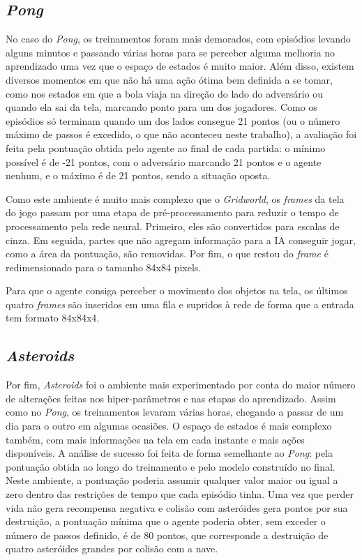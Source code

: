 \subsection{\textit{Pong}}
\label{sec:exp_pong}

No caso do \textit{Pong}, os treinamentos foram mais demorados, com episódios levando alguns minutos e passando várias horas para se perceber alguma melhoria no aprendizado uma vez que o espaço de estados é muito maior.
Além disso, existem diversos momentos em que não há uma ação ótima bem definida a se tomar, como nos estados em que a bola viaja na direção do lado do adversário ou quando ela sai da tela, marcando ponto para um dos jogadores.
Como os episódios só terminam quando um dos lados consegue 21 pontos (ou o número máximo de passos é excedido, o que não aconteceu neste trabalho), a avaliação foi feita pela pontuação obtida pelo agente ao final de cada partida:
o mínimo possível é de -21 pontos, com o adversário marcando 21 pontos e o agente nenhum, e o máximo é de 21 pontos, sendo a situação oposta.

Como este ambiente é muito mais complexo que o \textit{Gridworld}, os \textit{frames} da tela do jogo passam por uma etapa de pré-processamento para reduzir o tempo de processamento pela rede neural.
Primeiro, eles são convertidos para escalas de cinza.
Em seguida, partes que não agregam informação para a IA conseguir jogar, como a área da pontuação, são removidas.
Por fim, o que restou do \textit{frame} é redimensionado para o tamanho 84x84 pixels.

Para que o agente consiga perceber o movimento dos objetos na tela, os últimos quatro \textit{frames} são inseridos em uma fila e supridos à rede de forma que a entrada tem formato 84x84x4.

\subsection{\textit{Asteroids}}
\label{sec:exp_asteroids}

Por fim, \textit{Asteroids} foi o ambiente mais experimentado por conta do maior número de alterações feitas nos hiper-parâmetros e nas etapas do aprendizado.
Assim como no \textit{Pong}, os treinamentos levaram várias horas, chegando a passar de um dia para o outro em algumas ocasiões.
O espaço de estados é mais complexo também, com mais informações na tela em cada instante e mais ações disponíveis.
A análise de sucesso foi feita de forma semelhante ao \textit{Pong}: pela pontuação obtida ao longo do treinamento e pelo modelo construído no final.
Neste ambiente, a pontuação poderia assumir qualquer valor maior ou igual a zero dentro das restrições de tempo que cada episódio tinha.
Uma vez que perder vida não gera recompensa negativa e colisão com asteróides gera pontos por sua destruição, a pontuação mínima que o agente poderia obter, sem exceder o número de passos definido, é de 80 pontos, que corresponde a destruição de quatro asteróides grandes por colisão com a nave.

